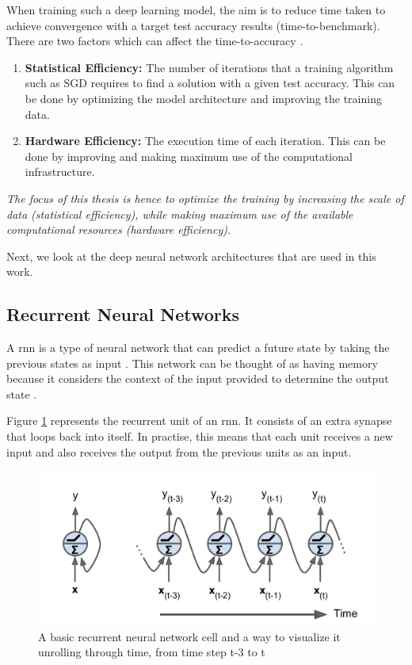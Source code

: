 When training such a deep learning model, the aim is to reduce time taken to achieve convergence with a target test accuracy results (time-to-benchmark). There are two factors which can affect the time-to-accuracy \cite{Koliousis2019CROSSBOW:Servers}.
\begin{enumerate}
    \item \textbf{Statistical Efficiency:} The number of iterations that a training algorithm such as SGD requires to find a solution with a given test accuracy. This can be done by optimizing the model architecture and improving the training data.
    \item  \textbf{Hardware Efficiency:} The execution time of each iteration. This can be done by improving and making maximum use of the computational infrastructure. 
\end{enumerate}

\emph{The focus of this thesis is hence to optimize the training by increasing the scale of data (statistical efficiency), while making maximum use of the available computational resources (hardware efficiency).} 
\newline

Next, we look at the deep neural network architectures that are used in this work. 
\subsection {Recurrent Neural Networks}
A \acrfull{rnn} is a type of neural network that can predict a future state by taking the previous states as input \cite{Graves2013SpeechNetworks}. This network can be thought of as having memory because it considers the context of the input provided to determine the output state \cite{Hagner2017RecurrentModel}.

Figure \ref{fig:rnn} represents the recurrent unit of an \acrshort{rnn}. It consists of an extra synapse that loops back into itself. In practise, this means that each unit receives a new input and also receives the output from the previous units as an input.
\begin{figure}[ht]
  \begin{center}
    \includegraphics[width=\textwidth]{images/rnn.png} 
    \caption{A basic recurrent neural network cell and a way to visualize it
unrolling through time, from time step t-3 to t \cite{Hagner2017RecurrentModel}}
    \label{fig:rnn}
  \end{center}
\end{figure}

